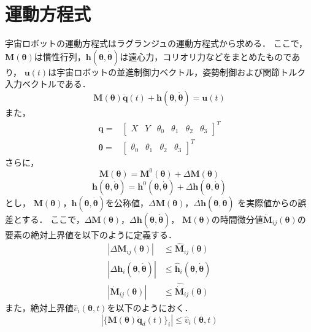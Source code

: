 \documentclass[10pt, a4j, uplatex, dvipdfmx, twocolumn]{jsarticle}
\begin{document}
\section{運動方程式}
宇宙ロボットの運動方程式はラグランジュの運動方程式から求める．
ここで，$\bm{M}(\bm{\theta})$は慣性行列，$\bm{h}(\bm{\theta},\dot{\bm{\theta}})$は遠心力，コリオリ力などをまとめたものであり，
$\bm{u}(t)$は宇宙ロボットの並進制御力ベクトル，姿勢制御および関節トルク入力ベクトルである．
\begin{equation}
    \bm{M}(\bm{\theta})\ddot{\bm{q}}(t)+\bm{h}(\bm{\theta},\dot{\bm{\theta}})=\bm{u}(t)
\end{equation}
また，
\begin{align*}
    \bm{q}=&
    \begin{bmatrix}
        X&Y&\theta_0&\theta_1&\theta_2&\theta_3
    \end{bmatrix}^T\\
    \bm{\theta}=&
    \begin{bmatrix}
        \theta_0&\theta_1&\theta_2&\theta_3
    \end{bmatrix}^T
\end{align*}
さらに，
\begin{equation}
    \bm{M}(\bm{\theta})=\bm{M}^0(\bm{\theta})+\Delta\bm{M}(\bm{\theta})
\end{equation}
\begin{equation}
    \bm{h}(\bm{\theta},\dot{\bm{\theta}})=\bm{h}^0(\bm{\theta},\dot{\bm{\theta}})+\Delta\bm{h}(\bm{\theta},\dot{\bm{\theta}})
\end{equation}
とし，
$\bm{M}(\bm{\theta})$，$\bm{h}(\bm{\theta},\dot{\bm{\theta}})$を公称値，$\Delta\bm{M}(\bm{\theta})$，$\Delta\bm{h}(\bm{\theta},\dot{\bm{\theta}})$
を実際値からの誤差とする．
ここで，$\Delta\bm{M}(\bm{\theta})$，$\Delta\bm{h}(\bm{\theta},\dot{\bm{\theta}})$，
$\bm{M}(\bm{\theta})$の時間微分値$\dot{\bm{M}}_{ij}(\bm{\theta})$の要素の絶対上界値を以下のように定義する．
\begin{align}
    |\Delta\bm{M}_{ij}(\bm{\theta})|&\leq \hat{\bm{M}}_{ij}(\bm{\theta})\\
    |\Delta\bm{h}_i(\bm{\theta},\dot{\bm{\theta}})|&\leq \hat{\bm{h}}_i(\bm{\theta},\dot{\bm{\theta}})\\
    |\dot{\bm{M}}_{ij}(\bm{\theta})|&\leq \hat{\dot{\bm{M}}}_{ij}(\bm{\theta})
\end{align}
また，絶対上界値$\hat{v}_i(\bm{\theta},t)$を以下のようにおく．
\begin{equation}
    |\{\bm{M}(\bm{\theta})\ddot{\bm{q}}_d(t)\}_i|\leq \hat{v}_i(\bm{\theta},t)
\end{equation}
\end{document}
